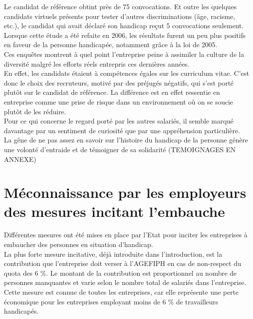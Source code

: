 Le candidat de référence obtint près de 75 convocations.
Et outre les quelques candidats virtuels présents pour tester d'autres discriminations (\^age, racisme, etc.), le candidat qui avait déclaré son handicap reçut 5 convocations seulement.\\

Lorsque cette étude a été refaite en 2006, les résultats furent un peu plus positifs en faveur de la personne handicapée, notamment gr\^ace à la loi de 2005.\\

Ces enqu\^etes montrent à quel point l'entreprise peine à assimiler la culture de la diversité malgré les efforts réels entrepris ces dernières années. \\
En effet, les candidats étaient à compétences égales sur les curriculum vitae. C'est donc le choix des recruteurs, motivé par des préjugés négatifs, qui s'est porté plut\^ot sur le candidat de référence. La différence est en effet ressentie en entreprise comme une prise de risque dans un environnement où on se soucie plutôt de les réduire.\\

Pour ce qui concerne le regard porté par les autres salariés, il semble marqué davantage par un sentiment de curiosité que par une appréhension particulière. La gêne de ne pas assez en savoir sur l'histoire du handicap de la personne génère une volonté d'entraide et de témoigner de sa solidarité (TEMOIGNAGES EN ANNEXE)


\section{Méconnaissance par les employeurs des mesures incitant l'embauche}
\label{mesuresIncitatives}

Différentes mesures ont été mises en place par l'Etat pour inciter les entreprises à embaucher des personnes en situation d'handicap. \\

La plus forte mesure incitative, déjà introduite dans l'introduction, est la contribution que l'entreprise doit verser à l'AGEFIPH en cas de non-respect du quota des 6 \%. Le montant de la contribution est proportionnel au nombre de personnes manquantes et varie selon le nombre total de salariés dans l'entreprise.
Cette mesure est connue de toutes les entreprises, car elle représente une perte économique pour les entreprises employant moins de 6 \% de travailleurs handicapés.\\

